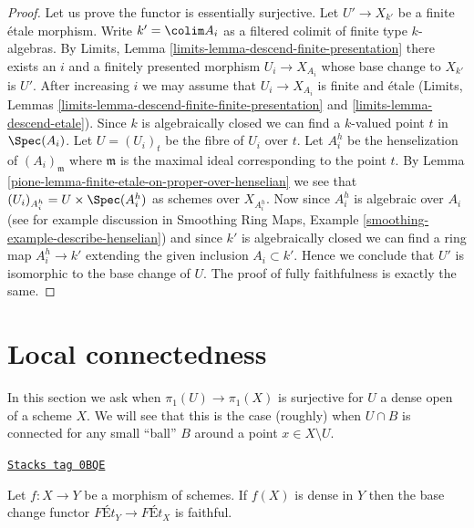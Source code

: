\begin{proof}

Let us prove the functor is essentially surjective.
Let $U' \to X_{k'}$ be a finite \'etale morphism.
Write $k' = \colim A_i$ as a filtered colimit of finite type $k$-algebras.
By Limits, Lemma \ref{limits-lemma-descend-finite-presentation}
there exists an $i$ and a finitely presented morphism $U_i \to X_{A_i}$
whose base change to $X_{k'}$ is $U'$. After increasing $i$
we may assume that $U_i \to X_{A_i}$ is finite and \'etale
(Limits, Lemmas \ref{limits-lemma-descend-finite-finite-presentation} and
\ref{limits-lemma-descend-etale}).
Since $k$ is algebraically closed we can find a
$k$-valued point $t$ in $\Spec(A_i)$. Let $U = (U_i)_t$ be the
fibre of $U_i$ over $t$. Let $A_i^h$ be the
henselization of $(A_i)_{\mathfrak m}$ where $\mathfrak m$ is
the maximal ideal corresponding to the point $t$. By
Lemma \ref{pione-lemma-finite-etale-on-proper-over-henselian}
we see that $(U_i)_{A_i^h} = U \times \Spec(A_i^h)$ as schemes
over $X_{A_i^h}$. Now since
$A_i^h$ is algebraic over $A_i$ (see for example discussion in
Smoothing Ring Maps, Example \ref{smoothing-example-describe-henselian})
and since $k'$ is algebraically closed
we can find a ring map $A_i^h \to k'$ extending the given
inclusion $A_i \subset k'$. Hence we conclude that $U'$
is isomorphic to the base change of $U$.
The proof of fully faithfulness is exactly the same.
\end{proof}

\section{Local connectedness}
\label{pione-section-unibranch}
In this section we ask when $\pi_1(U) \to \pi_1(X)$ is surjective
for $U$ a dense open of a scheme $X$. We will see that this is the
case (roughly) when $U \cap B$ is connected for any small
``ball'' $B$ around a point $x \in X \setminus U$.

\begin{lemma}
\label{pione-lemma-dense-faithful}
\href{https://stacks.math.columbia.edu/tag/0BQE}{\texttt{Stacks tag 0BQE}}

Let $f : X \to Y$ be a morphism of schemes. If $f(X)$ is dense in $Y$
then the base change functor $\textit{F\'Et}_Y \to \textit{F\'Et}_X$
is faithful.
\end{lemma}

